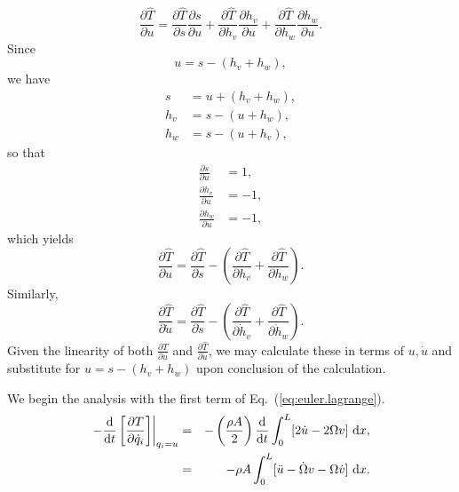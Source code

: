 \begin{equation}
\frac{\partial\hat T}{\partial u} = \frac{\partial \hat T}{\partial s}\frac{\partial s}{\partial u}+\frac{\partial \hat T}{\partial h_v}\frac{\partial h_v}{\partial u}+\frac{\partial \hat T}{\partial h_w}\frac{\partial h_w}{\partial u}.
\end{equation}
Since
\begin{equation}
u = s-(h_v+h_w),
\end{equation}
we have
\begin{eqnarray}
s &= u+(h_v+h_w),\\
h_v &= s-(u+h_w),\\
h_w &= s-(u+h_v),
\end{eqnarray}
so that
\begin{eqnarray}
\frac{\partial s}{\partial u} &= 1,\\
\frac{\partial h_v}{\partial u} &= -1,\\
\frac{\partial h_w}{\partial u} &= -1,
\end{eqnarray}
which yields
\begin{equation}
\frac{\partial\hat T}{\partial u} = \frac{\partial \hat T}{\partial s}-\left(\frac{\partial \hat T}{\partial h_v}+\frac{\partial \hat T}{\partial h_w}\right).
\end{equation}
Similarly,
\begin{equation}
\frac{\partial\hat T}{\partial \dot u} = \frac{\partial \hat T}{\partial \dot s}-\left(\frac{\partial \hat T}{\partial \dot h_v}+\frac{\partial \hat T}{\partial \dot h_w}\right).
\end{equation}
Given the linearity of both $\frac{\partial \hat T}{\partial u}$ and $\frac{\partial \hat T}{\partial \dot u}$, we may calculate these in terms of $u,\dot u$ and substitute for $u=s-(h_v+h_w)$ upon conclusion of the calculation.

\noindent We begin the analysis with the first term of Eq.~(\ref{eq:euler.lagrange}).
\begin{eqnarray}
\left.-\frac{\text d}{\text dt}\left[\frac{\partial T}{\partial \dot q_i}\right]\right|_{q_i=u} 
&=& -\left(\frac{\rho A}{2}\right)\frac{\text d}{\text dt}\int_0^L[2\dot u-2\Omega v]\text{ d}x,\\
&=& -\rho A\int_0^L [\ddot u-\dot \Omega v-\Omega \dot v]\text{ d}x.
\end{eqnarray}

